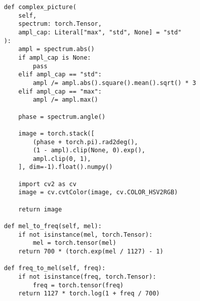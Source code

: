 \begin{verbatim}
    def complex_picture(
        self, 
        spectrum: torch.Tensor, 
        ampl_cap: Literal["max", "std", None] = "std"
    ):
        ampl = spectrum.abs()
        if ampl_cap is None:
            pass
        elif ampl_cap == "std":
            ampl /= ampl.abs().square().mean().sqrt() * 3
        elif ampl_cap == "max":
            ampl /= ampl.max()

        phase = spectrum.angle()

        image = torch.stack([
            (phase + torch.pi).rad2deg(),
            (1 - ampl).clip(None, 0).exp(),
            ampl.clip(0, 1),
        ], dim=-1).float().numpy()

        import cv2 as cv
        image = cv.cvtColor(image, cv.COLOR_HSV2RGB)

        return image

    def mel_to_freq(self, mel):
        if not isinstance(mel, torch.Tensor):
            mel = torch.tensor(mel)
        return 700 * (torch.exp(mel / 1127) - 1)

    def freq_to_mel(self, freq):
        if not isinstance(freq, torch.Tensor):
            freq = torch.tensor(freq)
        return 1127 * torch.log(1 + freq / 700)

\end{verbatim}

